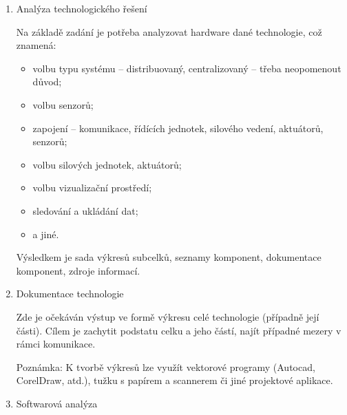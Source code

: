 \begin{enumerate}[label=\arabic*)]
    \item Analýza technologického řešení
    
    Na základě zadání je potřeba analyzovat hardware dané technologie, což znamená:
    \begin{itemize}
        \item volbu typu systému – distribuovaný, centralizovaný – třeba neopomenout důvod;
        \item volbu senzorů;
        \item zapojení – komunikace, řídících jednotek, silového vedení, aktuátorů, senzorů;
        \item volbu silových jednotek, aktuátorů;
        \item volbu vizualizační prostředí;
        \item sledování a ukládání dat;
        \item a jiné.
    \end{itemize}
    Výsledkem je sada výkresů subcelků, seznamy komponent, dokumentace komponent, zdroje
informací.
    \item Dokumentace technologie
    
    Zde je očekáván výstup ve formě výkresu celé technologie (případně její části). Cílem je zachytit podstatu celku a jeho částí, najít případné mezery v rámci komunikace.

    Poznámka: K tvorbě výkresů lze využít vektorové programy (Autocad, CorelDraw, atd.), tužku s papírem a scannerem či jiné projektové aplikace.

    \item Softwarová analýza
    

\end{enumerate}
